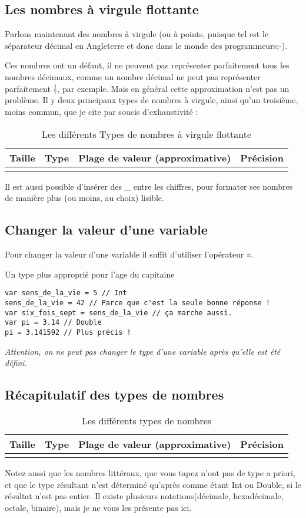 \subsection{Les nombres à virgule flottante}

Parlons maintenant des nombres à virgule (ou à points, puisque tel est le séparateur décimal en Angleterre et donc dans le monde des programmeurs;-).

Ces nombres ont un  défaut,
il ne peuvent pas représenter parfaitement tous les nombres décimaux,
comme un nombre décimal ne peut pas représenter parfaitement
\begin{math} \frac{1}{7} \end{math}, par exemple.
Mais en général cette approximation n'est pas un problème.
Il y deux principaux types de nombres à virgule, ainsi qu'un troisième,
moins commun, que je cite par soucis d'exhaustivité :
\begin{longtabu} to \linewidth {|X[3,l,m]|X[1,l,m]|X[4,r,m]|X[3,r,m]|}
\hline Taille & Type & Plage de valeur (approximative) & Précision \\ \hline
\endhead

\caption{Les différents Types de nombres à virgule flottante}
\end{longtabu}

Il est aussi possible d'insérer des \_ entre les chiffres,
pour formater ses nombres de manière plus (ou moins, au choix) lisible.

\subsection{Changer la valeur d'une variable}
Pour changer la valeur d'une variable il suffit d'utiliser l'opérateur \verb"=".
\begin{listing}[h]
\caption{Un type plus approprié pour l'age du capitaine}
\begin{verbatim}
var sens_de_la_vie = 5 // Int
sens_de_la_vie = 42 // Parce que c'est la seule bonne réponse !
var six_fois_sept = sens_de_la_vie // ça marche aussi.
var pi = 3.14 // Double
pi = 3.141592 // Plus précis !
\end{verbatim}
\end{listing}

\emph{Attention, on ne peut pas changer le type d'une variable après qu'elle est été défini.}
\subsection{Récapitulatif des types de nombres}
\begin{longtabu} to \linewidth {|X[2,l,m]|X[1,l,m]|X[4,r,m]|X[2,r,m]|}
\hline Taille & Type & Plage de valeur (approximative) & Précision \\ \hline
\endhead


\caption{Les différents types de nombres}
\end{longtabu}
Notez aussi que les nombres littéraux, que vous tapez n'ont pas de type a priori, et que le type résultant n'est déterminé qu'après comme étant Int ou Double, si le résultat n'est pas entier. Il existe plusieurs notations(décimale, hexadécimale, octale, binaire), mais je ne vous les présente pas ici.

